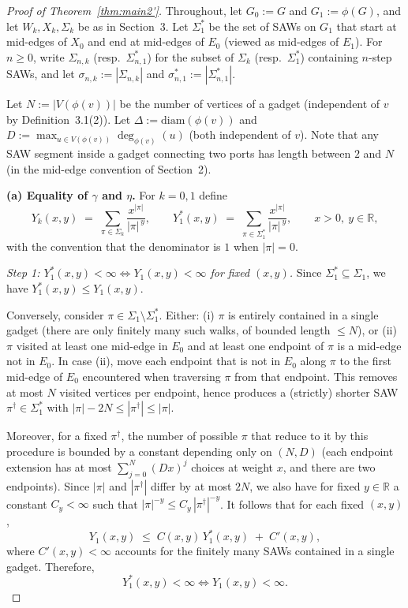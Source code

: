\documentclass[10pt,a4paper]{amsart}
\begin{document}
\begin{proof}[Proof of Theorem~\ref{thm:main2'}]
Throughout, let $G_0:=G$ and $G_1:=\phi(G)$, and let $W_k,X_k,\Sigma_k$ be as in
Section~3.  Let $\Sigma_1^\ast$ be the set of SAWs on $G_1$ that start at mid-edges of $X_0$
and end at mid-edges of $E_0$ (viewed as mid-edges of $E_1$).  For $n\ge 0$, write
$\Sigma_{n,k}$ (resp.\ $\Sigma_{n,1}^\ast$) for the subset of $\Sigma_k$ (resp.\ $\Sigma_1^\ast$)
containing $n$-step SAWs, and let $\sigma_{n,k}:=|\Sigma_{n,k}|$ and $\sigma_{n,1}^\ast:=|\Sigma_{n,1}^\ast|$.

Let $N:=|V(\phi(v))|$ be the number of vertices of a gadget (independent of $v$ by
Definition~3.1(2)).  Let $\Delta:=\mathrm{diam}(\phi(v))$ and $D:=\max_{u\in V(\phi(v))}\deg_{\phi(v)}(u)$
(both independent of $v$).  Note that any SAW segment inside a gadget connecting two
ports has length between $2$ and $N$ (in the mid-edge convention of Section~2).

\medskip\noindent
\textbf{(a) Equality of $\gamma$ and $\eta$.}
For $k=0,1$ define
\[
Y_k(x,y)\;=\;\sum_{\pi\in\Sigma_k}\frac{x^{|\pi|}}{|\pi|^{\,y}},
\qquad
Y_1^\ast(x,y)\;=\;\sum_{\pi\in\Sigma_1^\ast}\frac{x^{|\pi|}}{|\pi|^{\,y}},
\qquad x>0,\ y\in\mathbb{R},
\]
with the convention that the denominator is $1$ when $|\pi|=0$.

\smallskip\noindent
\emph{Step 1: $Y_1^\ast(x,y)<\infty \iff Y_1(x,y)<\infty$ for fixed $(x,y)$.}
Since $\Sigma_1^\ast\subseteq \Sigma_1$, we have $Y_1^\ast(x,y)\le Y_1(x,y)$.

Conversely, consider $\pi\in\Sigma_1\setminus\Sigma_1^\ast$.  Either:
(i) $\pi$ is entirely contained in a single gadget (there are only finitely many such walks,
of bounded length $\le N$), or
(ii) $\pi$ visited at least one mid-edge in $E_0$ and at least one endpoint of $\pi$ is a mid-edge not in $E_0$.
In case (ii), move each endpoint that is not in $E_0$ along $\pi$ to the first mid-edge of $E_0$
encountered when traversing $\pi$ from that endpoint.  This removes at most $N$ visited vertices
per endpoint, hence produces a (strictly) shorter SAW $\pi^\dagger\in \Sigma_1^\ast$ with
$|\pi|-2N\le |\pi^\dagger|\le |\pi|$.

Moreover, for a fixed $\pi^\dagger$, the number of possible $\pi$ that reduce to it by this procedure
is bounded by a constant depending only on $(N,D)$ (each endpoint extension has at most $\sum_{j=0}^{N}(Dx)^j$
choices at weight $x$, and there are two endpoints).  Since $|\pi|$ and $|\pi^\dagger|$ differ by at most $2N$,
we also have for fixed $y\in\mathbb{R}$ a constant $C_y<\infty$ such that
$|\pi|^{-y}\le C_y\,|\pi^\dagger|^{-y}$.
It follows that for each fixed $(x,y)$,
\[
Y_1(x,y)\;\le\;C(x,y)\,Y_1^\ast(x,y)\;+\;C'(x,y),
\]
where $C'(x,y)<\infty$ accounts for the finitely many SAWs contained in a single gadget.
Therefore,
\begin{equation}\label{eq:Ystar-equiv}
Y_1^\ast(x,y)<\infty \iff Y_1(x,y)<\infty .
\end{equation}


\end{proof}
\end{document}
